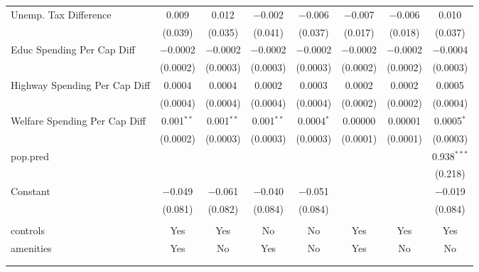 \begin{table}[!htbp]
\begin{tabular}{@{\extracolsep{5pt}}lccccccc}
  Unemp. Tax Difference & 0.009 & 0.012 & $-$0.002 & $-$0.006 & $-$0.007 & $-$0.006 & 0.010 \\ 
  & (0.039) & (0.035) & (0.041) & (0.037) & (0.017) & (0.018) & (0.037) \\ 
  Educ Spending Per Cap Diff & $-$0.0002 & $-$0.0002 & $-$0.0002 & $-$0.0002 & $-$0.0002 & $-$0.0002 & $-$0.0004 \\ 
  & (0.0002) & (0.0003) & (0.0003) & (0.0003) & (0.0002) & (0.0002) & (0.0003) \\ 
  Highway Spending Per Cap Diff & 0.0004 & 0.0004 & 0.0002 & 0.0003 & 0.0002 & 0.0002 & 0.0005 \\ 
  & (0.0004) & (0.0004) & (0.0004) & (0.0004) & (0.0002) & (0.0002) & (0.0004) \\ 
  Welfare Spending Per Cap Diff & 0.001$^{**}$ & 0.001$^{**}$ & 0.001$^{**}$ & 0.0004$^{*}$ & 0.00000 & 0.00001 & 0.0005$^{*}$ \\ 
  & (0.0002) & (0.0003) & (0.0003) & (0.0003) & (0.0001) & (0.0001) & (0.0003) \\ 
  pop.pred &  &  &  &  &  &  & 0.938$^{***}$ \\ 
  &  &  &  &  &  &  & (0.218) \\ 
  Constant & $-$0.049 & $-$0.061 & $-$0.040 & $-$0.051 &  &  & $-$0.019 \\ 
  & (0.081) & (0.082) & (0.084) & (0.084) &  &  & (0.084) \\ 
 \hline \\[-1.8ex] 
controls & Yes & Yes & No & No & Yes & Yes & Yes \\ 
amenities & Yes & No & Yes & No & Yes & No & No \\ 
\hline \\[-1.8ex] 
\hline 
\hline \\[-1.8ex] 
\end{tabular} 
\end{table} 
